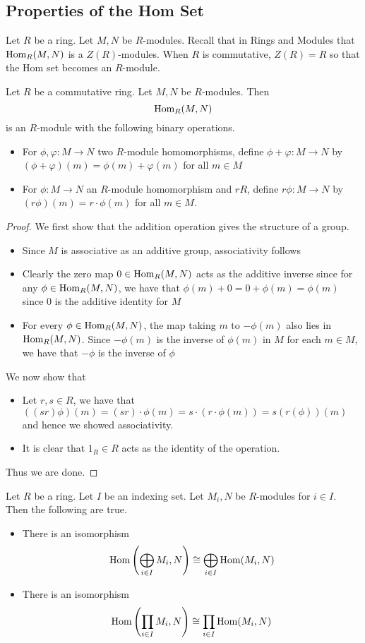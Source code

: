 \documentclass[a4paper]{article}
\begin{document}
\subsection{Properties of the Hom Set}
Let $R$ be a ring. Let $M,N$ be $R$-modules. Recall that in Rings and Modules that $\operatorname{Hom}_R(M,N)$ is a $Z(R)$-modules. When $R$ is commutative, $Z(R)=R$ so that the Hom set becomes an $R$-module. 

\begin{prp}{}{} Let $R$ be a commutative ring. Let $M,N$ be $R$-modules. Then $$\operatorname{Hom}_R(M,N)$$ is an $R$-module with the following binary operations. 
\begin{itemize}
\item For $\phi,\varphi:M\to N$ two $R$-module homomorphisms, define $\phi+\varphi:M\to N$ by $(\phi+\varphi)(m)=\phi(m)+\varphi(m)$ for all $m\in M$
\item For $\phi:M\to N$ an $R$-module homomorphism and $r R$, define $r\phi:M\to N$ by $(r\phi)(m)=r\cdot\phi(m)$ for all $m\in M$. 
\end{itemize} \tcbline
\begin{proof}
We first show that the addition operation gives the structure of a group. 
\begin{itemize}
\item Since $M$ is associative as an additive group, associativity follows
\item Clearly the zero map $0\in\operatorname{Hom}_R(M,N)$ acts as the additive inverse since for any $\phi\in\operatorname{Hom}_R(M,N)$, we have that $\phi(m)+0=0+\phi(m)=\phi(m)$ since $0$ is the additive identity for $M$
\item For every $\phi\in\operatorname{Hom}_R(M,N)$, the map taking $m$ to $-\phi(m)$ also lies in $\operatorname{Hom}_R(M,N)$. Since $-\phi(m)$ is the inverse of $\phi(m)$ in $M$ for each $m\in M$, we have that $-\phi$ is the inverse of $\phi$
\end{itemize}
We now show that 
\begin{itemize}
\item Let $r,s\in R$, we have that $((sr)\phi)(m)=(sr)\cdot\phi(m)=s\cdot(r\cdot\phi(m))=s(r(\phi))(m)$ and hence we showed associativity. 
\item It is clear that $1_R\in R$ acts as the identity of the operation. 
\end{itemize}
Thus we are done. 
\end{proof}
\end{prp}

\begin{prp}{}{} Let $R$ be a ring. Let $I$ be an indexing set. Let $M_i,N$ be $R$-modules for $i\in I$. Then the following are true. 
\begin{itemize}
\item There is an isomorphism $$\operatorname{Hom}\left(\bigoplus_{i\in I}M_i,N\right)\cong\bigoplus_{i\in I}\operatorname{Hom}(M_i,N)$$
\item There is an isomorphism $$\operatorname{Hom}\left(\prod_{i\in I}M_i,N\right)\cong\prod_{i\in I}\operatorname{Hom}(M_i,N)$$
\end{itemize} \tcbline
\end{prp}
\end{document}
